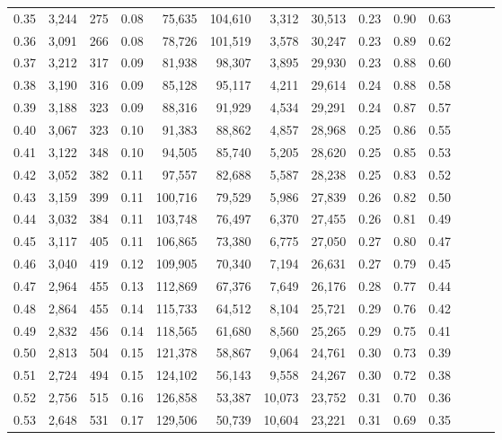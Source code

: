 \begin{tabular}{rrrrrrrrrrrrrr}
0.35 &  3,244 &  275 &  0.08 &   75,635 &  104,610 &   3,312 &  30,513 &  0.23 &  0.90 &      0.63 \\
0.36 &  3,091 &  266 &  0.08 &   78,726 &  101,519 &   3,578 &  30,247 &  0.23 &  0.89 &      0.62 \\
0.37 &  3,212 &  317 &  0.09 &   81,938 &   98,307 &   3,895 &  29,930 &  0.23 &  0.88 &      0.60 \\
0.38 &  3,190 &  316 &  0.09 &   85,128 &   95,117 &   4,211 &  29,614 &  0.24 &  0.88 &      0.58 \\
0.39 &  3,188 &  323 &  0.09 &   88,316 &   91,929 &   4,534 &  29,291 &  0.24 &  0.87 &      0.57 \\
0.40 &  3,067 &  323 &  0.10 &   91,383 &   88,862 &   4,857 &  28,968 &  0.25 &  0.86 &      0.55 \\
0.41 &  3,122 &  348 &  0.10 &   94,505 &   85,740 &   5,205 &  28,620 &  0.25 &  0.85 &      0.53 \\
0.42 &  3,052 &  382 &  0.11 &   97,557 &   82,688 &   5,587 &  28,238 &  0.25 &  0.83 &      0.52 \\
0.43 &  3,159 &  399 &  0.11 &  100,716 &   79,529 &   5,986 &  27,839 &  0.26 &  0.82 &      0.50 \\
0.44 &  3,032 &  384 &  0.11 &  103,748 &   76,497 &   6,370 &  27,455 &  0.26 &  0.81 &      0.49 \\
0.45 &  3,117 &  405 &  0.11 &  106,865 &   73,380 &   6,775 &  27,050 &  0.27 &  0.80 &      0.47 \\
0.46 &  3,040 &  419 &  0.12 &  109,905 &   70,340 &   7,194 &  26,631 &  0.27 &  0.79 &      0.45 \\
0.47 &  2,964 &  455 &  0.13 &  112,869 &   67,376 &   7,649 &  26,176 &  0.28 &  0.77 &      0.44 \\
0.48 &  2,864 &  455 &  0.14 &  115,733 &   64,512 &   8,104 &  25,721 &  0.29 &  0.76 &      0.42 \\
0.49 &  2,832 &  456 &  0.14 &  118,565 &   61,680 &   8,560 &  25,265 &  0.29 &  0.75 &      0.41 \\
0.50 &  2,813 &  504 &  0.15 &  121,378 &   58,867 &   9,064 &  24,761 &  0.30 &  0.73 &      0.39 \\
0.51 &  2,724 &  494 &  0.15 &  124,102 &   56,143 &   9,558 &  24,267 &  0.30 &  0.72 &      0.38 \\
0.52 &  2,756 &  515 &  0.16 &  126,858 &   53,387 &  10,073 &  23,752 &  0.31 &  0.70 &      0.36 \\
0.53 &  2,648 &  531 &  0.17 &  129,506 &   50,739 &  10,604 &  23,221 &  0.31 &  0.69 &      0.35 \\

\end{tabular}
